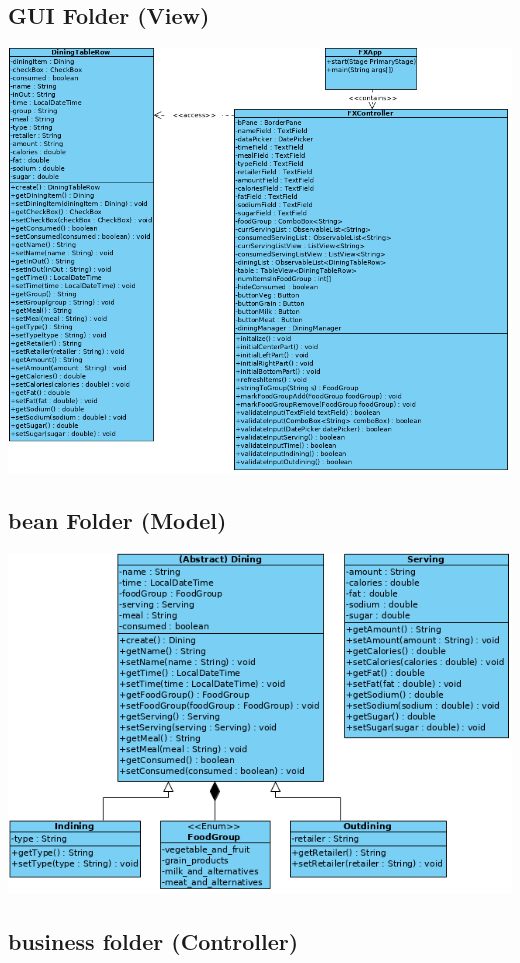 \documentclass{scrreprt}
\begin{document}
\subsection{GUI Folder (View)}

\includegraphics[width=17cm]{pictures/GUI-Class-Diagram.png}

\subsection{bean Folder (Model)}

\includegraphics{pictures/Bean-Class-Diagram.png}

\subsection{business folder (Controller)}
\end{document}
